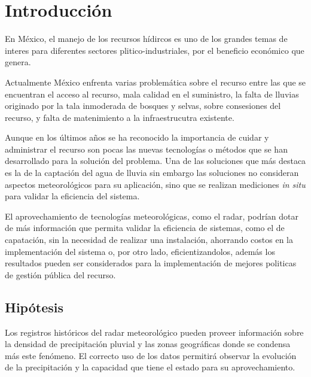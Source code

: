 \documentclass[letterpaper,12pt,oneside]{book}
\begin{document}


\chapter{Introducción}
    En México, el manejo de los recursos hídircos es uno de los grandes temas de interes para diferentes sectores plitico-industriales, por el beneficio económico que genera. 

    Actualmente México enfrenta varias problemática sobre el recurso entre las que se encuentran el acceso al recurso, mala calidad en el suministro, la falta de lluvias originado por la tala inmoderada de bosques y selvas, sobre consesiones del recurso\cite{jornada:agua}, y falta de matenimiento a la infraestrucutra existente.

    Aunque en los últimos años se ha reconocido la importancia de cuidar y administrar el recurso \cite{de2019objetivo} \cite{mex:procaptar} son pocas las nuevas tecnologías o métodos que se han desarrollado para la solución del problema. Una de las soluciones que más destaca es la de la captación del agua de lluvia \cite{comision2016lineamientos} \cite{hugues2019captacion} \cite{nickisch2018sistemas} \cite{van2013captacion} sin embargo las soluciones no consideran aspectos meteorológicos para su aplicación, sino que se realizan mediciones \textit{in situ} para validar la eficiencia del sistema.

    El aprovechamiento de tecnologías meteorológicas, como el radar, podrían dotar de más información que permita validar la eficiencia de sistemas, como el de capatación, sin la necesidad de realizar una instalación, ahorrando costos en la implementación del sistema o, por otro lado, eficientizandolos, además los resultados pueden ser considerados para la implementación de mejores politicas de gestión pública del recurso.
\newpage
    \section{Hipótesis}
        Los registros históricos del radar meteorológico pueden proveer información sobre la densidad de precipitación pluvial y las zonas geográficas donde se condensa más este fenómeno. El correcto uso de los datos permitirá observar la evolución de la precipitación y la capacidad que tiene el estado para su aprovechamiento.
\end{document}
